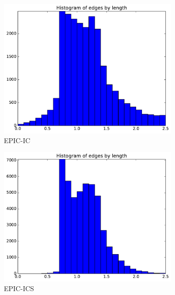 \documentclass[3p,times,procedia,number]{elsarticle}
\begin{document}
\begin{figure}
\begin{subfigure}{.4\textwidth}
\centering
\includegraphics[width=\textwidth]{epic-ic-cube-cylinder-polar-2-length.pdf}
\caption{EPIC-IC}
\end{subfigure}
\begin{subfigure}{.4\textwidth}
\centering
\includegraphics[width=\textwidth]{epic-ics-cube-cylinder-polar-2-length.pdf}
\caption{EPIC-ICS}
\end{subfigure}
\begin{subfigure}{.4\textwidth}
\centering

\end{subfigure}
\end{figure}
\end{document}
